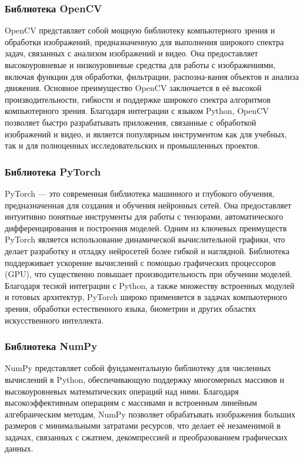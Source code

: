 \subsubsection{Библиотека OpenCV}

OpenCV представляет собой мощную библиотеку компьютерного зрения и обработки изображений, предназначенную для выполнения широкого спектра задач, связанных с анализом изображений и видео. Она предоставляет высокоуровневые и низкоуровневые средства для работы с изображениями, включая функции для обработки, фильтрации, распозна-вания объектов и анализа движения. Основное преимущество OpenCV заключается в её высокой производительности, гибкости и поддержке широкого спектра алгоритмов компьютерного зрения. Благодаря интеграции с языком Python, OpenCV позволяет быстро разрабатывать приложения, связанные с обработкой изображений и видео, и является популярным инструментом как для учебных, так и для полноценных исследовательских и промышленных проектов.

\subsubsection{Библиотека PyTorch}

PyTorch — это современная библиотека машинного и глубокого обучения, предназначенная для создания и обучения нейронных сетей. Она предоставляет интуитивно понятные инструменты для работы с тензорами, автоматического дифференцирования и построения моделей. Одним из ключевых преимуществ PyTorch является использование динамической вычислительной графики, что делает разработку и отладку нейросетей более гибкой и наглядной. Библиотека поддерживает ускорение вычислений с помощью графических процессоров (GPU), что существенно повышает производительность при обучении моделей. Благодаря тесной интеграции с Python, а также множеству встроенных модулей и готовых архитектур, PyTorch широко применяется в задачах компьютерного зрения, обработки естественного языка, биометрии и других областях искусственного интеллекта\cite{pytorch}.

\subsubsection{Библиотека NumPy}

NumPy представляет собой фундаментальную библиотеку для численных вычислений в Python, обеспечивающую поддержку многомерных массивов и высокоуровневых математических операций над ними. Благодаря высокоэффективным операциям с массивами и встроенным линейным алгебраическим методам, NumPy позволяет обрабатывать изображения больших размеров с минимальными затратами ресурсов, что делает её незаменимой в задачах, связанных с сжатием, декомпрессией и преобразованием графических данных.

